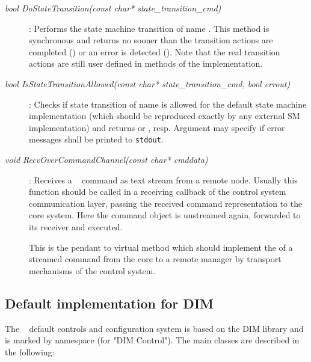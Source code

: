 \begin{description}

 
\item[\em bool DoStateTransition(const char* state\_transition\_cmd)] :
Performs the state machine transition of name .
This method is synchronous and returns no sooner than the 
transition actions are completed () or an error is detected ().
Note that the real transition actions are still user defined in methods
of the  implementation.

\item[\em bool IsStateTransitionAllowed(const char* state\_transition\_cmd, bool errout)] :
Checks if state transition of name  is allowed
for the default state machine implementation (which should be reproduced exactly by
any external SM implementation) and returns  or , resp. Argument
 may specify if error messages shall be printed to {\tt stdout}.

\item[\em void RecvOverCommandChannel(const char* cmddata)] :
Receives a \dabc~ command as text stream  
from a remote node. Usually this function should be called in a
receiving callback of the control system communication layer,
passing the received command representation to the core system.
Here the command object is unstreamed again, forwarded to its
receiver and executed.

This is the pendant to virtual method 
 which should implement the  
of a streamed command from the core to a remote manager by transport mechanisms of the control system. 

 
 
\end{description}






\subsection{Default implementation for DIM}
\label{prog_manager_controls_DIM}
The \dabc~ default controls and configuration system 
is based on the DIM library \cite{DIM} and is marked by namespace
 (for "DIM Control"). 
The main classes are described in the following:

